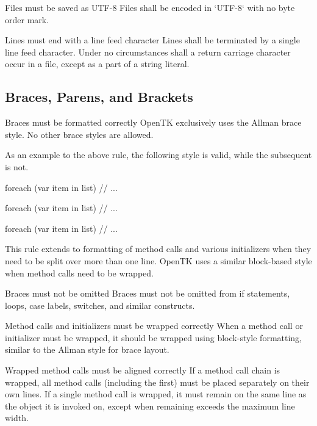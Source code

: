 \documentclass[11pt,a4paper]{article}
\newcounter{rule}[section]
\begin{document}
\begin{must}{Files must be saved as UTF-8}
Files shall be encoded in `UTF-8` with no byte order mark. 
\end{must}

\begin{must}{Lines must end with a line feed character}
Lines shall be terminated by a single line feed character. Under no circumstances shall a return carriage character occur in a file, except as a part of a string literal.
\end{must}

\subsection{Braces, Parens, and Brackets}
\begin{must}{Braces must be formatted correctly}
OpenTK exclusively uses the Allman brace style. No other brace styles are allowed.
\end{must}

As an example to the above rule, the following style is valid, while the subsequent is not.

\begin{code}
foreach (var item in list)
{
    // ...
}
\end{code}

\begin{code}
foreach (var item in list) {
    // ...
}

foreach (var item in list) { // ... }
\end{code}

This rule extends to formatting of method calls and various initializers when they need to be split over more than one line. OpenTK uses a similar block-based style when method calls need to be wrapped.

\begin{must}{Braces must not be omitted}
Braces must not be omitted from if statements, loops, case labels, switches, and similar constructs.
\end{must}

\begin{must}{Method calls and initializers must be wrapped correctly}
When a method call or initializer must be wrapped, it should be wrapped using block-style formatting, similar to the Allman style for brace layout.
\end{must}

\begin{must}{Wrapped method calls must be aligned correctly}
If a method call chain is wrapped, all method calls (including the first) must be placed separately on their own lines.
If a single method call is wrapped, it must remain on the same line as the object it is invoked on, except when remaining exceeds the maximum line width.
\end{must}
\end{document}
